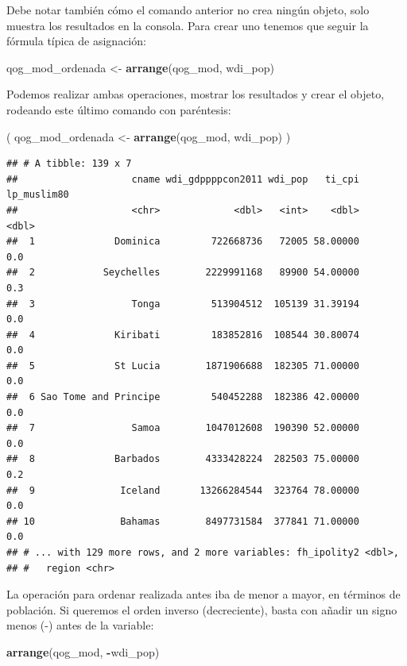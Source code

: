 \documentclass[]{book}
\newenvironment{Shaded}{\begin{snugshade}}{\end{snugshade}}
\newcommand{\KeywordTok}[1]{\textcolor[rgb]{0.13,0.29,0.53}{\textbf{#1}}}
\newcommand{\StringTok}[1]{\textcolor[rgb]{0.31,0.60,0.02}{#1}}
\newcommand{\OperatorTok}[1]{\textcolor[rgb]{0.81,0.36,0.00}{\textbf{#1}}}
\newcommand{\NormalTok}[1]{#1}
\begin{document}
Debe notar también cómo el comando anterior no crea ningún objeto, solo
muestra los resultados en la consola. Para crear uno tenemos que seguir
la fórmula típica de asignación:

\begin{Shaded}
\begin{Highlighting}[]
\NormalTok{qog_mod_ordenada <-}\StringTok{ }\KeywordTok{arrange}\NormalTok{(qog_mod, wdi_pop)}
\end{Highlighting}
\end{Shaded}

Podemos realizar ambas operaciones, mostrar los resultados y crear el
objeto, rodeando este último comando con paréntesis:

\begin{Shaded}
\begin{Highlighting}[]
\NormalTok{( qog_mod_ordenada <-}\StringTok{ }\KeywordTok{arrange}\NormalTok{(qog_mod, wdi_pop) )}
\end{Highlighting}
\end{Shaded}

\begin{verbatim}
## # A tibble: 139 x 7
##                    cname wdi_gdppppcon2011 wdi_pop   ti_cpi lp_muslim80
##                    <chr>             <dbl>   <int>    <dbl>       <dbl>
##  1              Dominica         722668736   72005 58.00000         0.0
##  2            Seychelles        2229991168   89900 54.00000         0.3
##  3                 Tonga         513904512  105139 31.39194         0.0
##  4              Kiribati         183852816  108544 30.80074         0.0
##  5              St Lucia        1871906688  182305 71.00000         0.0
##  6 Sao Tome and Principe         540452288  182386 42.00000         0.0
##  7                 Samoa        1047012608  190390 52.00000         0.0
##  8              Barbados        4333428224  282503 75.00000         0.2
##  9               Iceland       13266284544  323764 78.00000         0.0
## 10               Bahamas        8497731584  377841 71.00000         0.0
## # ... with 129 more rows, and 2 more variables: fh_ipolity2 <dbl>,
## #   region <chr>
\end{verbatim}

La operación para ordenar realizada antes iba de menor a mayor, en
términos de población. Si queremos el orden inverso (decreciente), basta
con añadir un signo menos (-) antes de la variable:

\begin{Shaded}
\begin{Highlighting}[]
\KeywordTok{arrange}\NormalTok{(qog_mod, }\OperatorTok{-}\NormalTok{wdi_pop)}
\end{Highlighting}
\end{Shaded}
\end{document}
